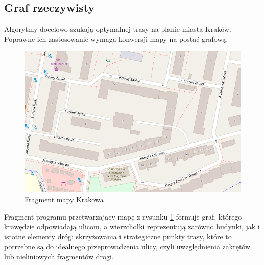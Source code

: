 \documentclass[a4paper, 12pt, twoside, openright]{article}
\begin{document}
\subsection{Graf rzeczywisty}\label{grafRzecz}
\indent\par
Algorytmy docelowo szukają optymalnej trasy na planie miasta Kraków. Poprawne ich zastosowanie wymaga konwersji mapy na postać grafową. 

\begin{figure}[H]
	\centering
	\includegraphics[width=1\textwidth]{img/grafRzecz/osm1}
	\caption[]{Fragment mapy Krakowa\footnotemark}
	\label{osm1}
\end{figure}


Fragment programu przetwarzający mapę z rysunku \ref{osm1} formuje graf, którego krawędzie odpowiadają ulicom, a wierzchołki reprezentują zarówno budynki, jak i istotne elementy dróg: skrzyżowania i strategiczne punkty trasy, które to potrzebne są do idealnego przeprowadzenia ulicy, czyli uwzględnienia zakrętów lub nieliniowych fragmentów drogi.
\end{document}
